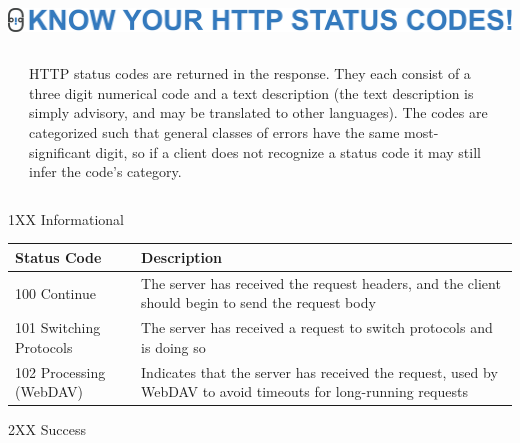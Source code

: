 \documentclass[final]{beamer}
\begin{document}
  \begin{frame}{}

    \begin{minipage}{\textwidth}
      \centering
      \includegraphics[]{./title-status-codes.pdf}
    \end{minipage}

    \vspace{0.5in}

    \begin{columns}
      \begin{column}{0.05\textwidth}
      \end{column}
      \begin{column}{0.9\textwidth}
        \begin{block}{}
          \large
            HTTP status codes are returned in the response. They each consist of
            a three digit numerical code and a text description (the text
            description is simply advisory, and may be translated to other
            languages). The codes are categorized such that general classes of
            errors have the same most-significant digit, so if a client does not
            recognize a status code it may still infer the code's category.
          \normalsize
        \end{block}
      \end{column}
      \begin{column}{0.05\textwidth}
      \end{column}
    \end{columns}

    \vspace{0.5in}

    \begin{block}{\huge 1XX Informational}

      \vspace{0.3in}

      \begin{tabular}{p{} p{}}
        Status Code & Description \\ \hline
        100 Continue & The server has received the request headers, and the client should begin to send the request body \\
        101 Switching Protocols & The server has received a request to switch protocols and is doing so \\
        102 Processing (WebDAV) & Indicates that the server has received the request, used by WebDAV to avoid timeouts for long-running requests \\
      \end{tabular}
    \end{block}
    \begin{block}{\huge 2XX Success}


\end{block}
\end{frame}
\end{document}
